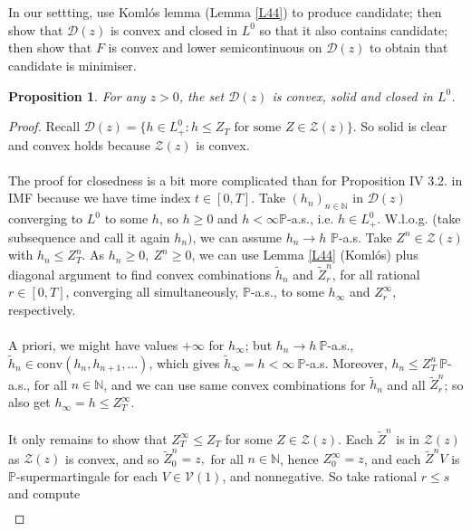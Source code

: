 \documentclass[12pt,a4paper, twoside]{article}
\newtheorem{prop}{Proposition}[section]
\theoremstyle{definition}
\newcommand{\PP}{\mathbb{P}} %
\begin{document}
\\\\
In our settting, use Komlós lemma (Lemma \ref{L44}) to produce candidate; then show that $\mathcal{D}(z)$ is convex and closed in $L^0$ so that it also contains candidate; then show that $F$ is convex and lower semicontinuous on $\mathcal{D}(z)$ to obtain that candidate is minimiser. 
\newpage
\begin{prop} \label{P112} For any $z>0$, the set $\mathcal{D}(z)$ is convex, solid and closed in $L^0$. 
\end{prop}
\begin{proof}
Recall $\mathcal{D}(z)= \{ h \in L_+^0: h \leq Z_T \text{ for some } Z \in \mathcal{Z}(z) \}$. So solid is clear and convex holds because $\mathcal{Z}(z)$ is convex. 
\\\\
The proof for closedness is a bit more complicated than for Proposition IV 3.2. in IMF because we have time index $t \in [0,T]$. Take $(h_n)_{n \in \mathbb{N}}$ in $\mathcal{D}(z)$ converging to $L^0$ to some $h$, so $h \geq 0$ and $h < \infty \PP$-a.s., i.e. $h \in L_+^0$. W.l.o.g. (take subsequence and call it again $h_n)$, we can assume $h_n \to h$ $\PP$-a.s. Take $Z^n \in \mathcal{Z}(z)$ with $h_n \leq Z_T^n$. As $h_n \geq 0, \ Z^n \geq 0$, we can use Lemma \ref{L44} (Komlós) plus diagonal argument to find convex combinations $\widetilde{h}_n$ and $\widetilde{Z}_r^n$, for all rational $r \in [0,T]$, converging all simultaneously, $\PP$-a.s., to some $h_\infty$ and $Z_r^\infty$, respectively. \\
\\
A priori, we might have values $+ \infty$ for $h_\infty$; but $h_n \to h \ \PP$-a.s., $\widetilde{h}_n \in \text{conv}(h_n, h_{n+1}, \dots )$, which gives $\widetilde{h}_\infty = h < \infty \ \PP$-a.s. Moreover, $h_n \leq Z_T^n \ \PP$-a.s., for all $n \in \mathbb{N}$, and we can use same convex combinations for $\widetilde{h}_n$ and all $\widetilde{Z}_r^n$; so also get $h_\infty = h \leq Z_T^\infty$. \\
\\
It only remains to show that $Z_T^\infty \leq Z_T$ for some $Z \in \mathcal{Z}(z)$. Each $\widetilde{Z}^n$ is in $\mathcal{Z}(z)$ as $\mathcal{Z}(z)$ is convex, and so $\widetilde{Z}_0^n=z,$ for all $n \in \mathbb{N}$, hence $Z_0^\infty= z$,  and each $\widetilde{Z}^nV$ is $\PP$-supermartingale for each $V \in \mathcal{V}(1)$, and nonnegative. So take rational $r \leq s$ and compute 
\begin{align*}

\end{align*}
\end{proof}
\end{document}

